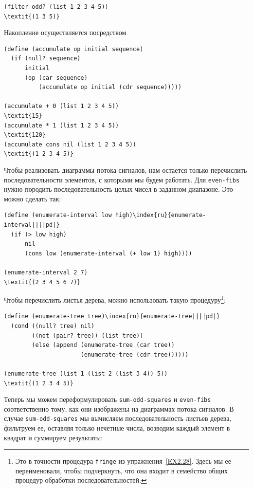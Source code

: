 \begin{Verbatim}[fontsize=\small]
(filter odd? (list 1 2 3 4 5))
\textit{(1 3 5)}
\end{Verbatim}

Накопление осуществляется посредством

\begin{Verbatim}[fontsize=\small]
(define (accumulate op initial sequence)
  (if (null? sequence)
      initial
      (op (car sequence)
          (accumulate op initial (cdr sequence)))))

(accumulate + 0 (list 1 2 3 4 5))
\textit{15}
(accumulate * 1 (list 1 2 3 4 5))
\textit{120}
(accumulate cons nil (list 1 2 3 4 5))
\textit{(1 2 3 4 5)}
\end{Verbatim}

Чтобы реализовать диаграммы потока сигналов, нам остается
только перечислить последовательности элементов, с которыми
мы будем работать. Для {\tt even-fibs} нужно породить
последовательность целых чисел в заданном диапазоне. Это можно сделать 
так:

\begin{Verbatim}[fontsize=\small]
(define (enumerate-interval low high)\index{ru}{enumerate-interval||||pd|}
  (if (> low high)
      nil
      (cons low (enumerate-interval (+ low 1) high))))

(enumerate-interval 2 7)
\textit{(2 3 4 5 6 7)}
\end{Verbatim}
Чтобы перечислить листья дерева, можно использовать
такую процедуру\footnote{Это в точности процедура {\tt fringe} 
из упражнения~\ref{EX2.28}. Здесь мы ее переименовали, чтобы
подчеркнуть, что она входит в семейство общих процедур обработки
последовательностей.}:

\begin{Verbatim}[fontsize=\small]
(define (enumerate-tree tree)\index{ru}{enumerate-tree||||pd|}
  (cond ((null? tree) nil)
        ((not (pair? tree)) (list tree))
        (else (append (enumerate-tree (car tree))
                      (enumerate-tree (cdr tree))))))

(enumerate-tree (list 1 (list 2 (list 3 4)) 5))
\textit{(1 2 3 4 5)}
\end{Verbatim}

Теперь мы можем переформулировать
{\tt sum-odd-squares} и {\tt even-fibs} соответственно
тому, как они 
изображены на диаграммах потока сигналов. В случае
{\tt sum-odd-squares} мы вычисляем последовательность листьев
дерева, фильтруем ее, оставляя только нечетные числа, возводим каждый
элемент в квадрат и суммируем результаты:


